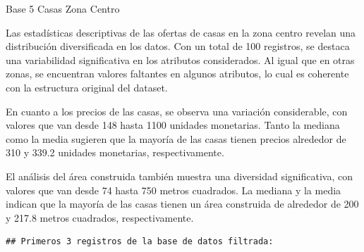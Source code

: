 \documentclass[
]{article}
\begin{document}
Base 5 Casas Zona Centro

Las estadísticas descriptivas de las ofertas de casas en la zona centro
revelan una distribución diversificada en los datos. Con un total de 100
registros, se destaca una variabilidad significativa en los atributos
considerados. Al igual que en otras zonas, se encuentran valores
faltantes en algunos atributos, lo cual es coherente con la estructura
original del dataset.

En cuanto a los precios de las casas, se observa una variación
considerable, con valores que van desde 148 hasta 1100 unidades
monetarias. Tanto la mediana como la media sugieren que la mayoría de
las casas tienen precios alrededor de 310 y 339.2 unidades monetarias,
respectivamente.

El análisis del área construida también muestra una diversidad
significativa, con valores que van desde 74 hasta 750 metros cuadrados.
La mediana y la media indican que la mayoría de las casas tienen un área
construida de alrededor de 200 y 217.8 metros cuadrados,
respectivamente.

\begin{verbatim}
## Primeros 3 registros de la base de datos filtrada:
\end{verbatim}
\end{document}
